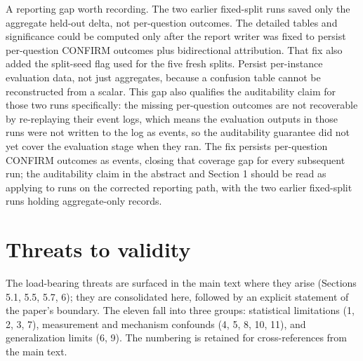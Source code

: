 A reporting gap worth recording. The two earlier fixed-split runs saved only the aggregate held-out delta, not per-question outcomes. The detailed tables and significance could be computed only after the report writer was fixed to persist per-question CONFIRM outcomes plus bidirectional attribution. That fix also added the split-seed flag used for the five fresh splits. Persist per-instance evaluation data, not just aggregates, because a confusion table cannot be reconstructed from a scalar. This gap also qualifies the auditability claim for those two runs specifically: the missing per-question outcomes are not recoverable by re-replaying their event logs, which means the evaluation outputs in those runs were not written to the log as events, so the auditability guarantee did not yet cover the evaluation stage when they ran. The fix persists per-question CONFIRM outcomes as events, closing that coverage gap for every subsequent run; the auditability claim in the abstract and Section 1 should be read as applying to runs on the corrected reporting path, with the two earlier fixed-split runs holding aggregate-only records.


\section{Threats to validity}

The load-bearing threats are surfaced in the main text where they arise (Sections 5.1, 5.5, 5.7, 6); they are consolidated here, followed by an explicit statement of the paper's boundary. The eleven fall into three groups: statistical limitations (1, 2, 3, 7), measurement and mechanism confounds (4, 5, 8, 10, 11), and generalization limits (6, 9). The numbering is retained for cross-references from the main text.

